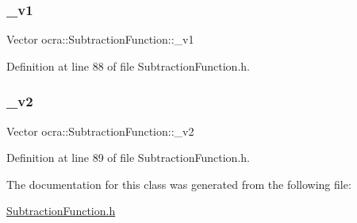 \subsubsection{\texorpdfstring{\+\_\+v1}{\_v1}}
{\footnotesize\ttfamily Vector ocra\+::\+Subtraction\+Function\+::\+\_\+v1\hspace{0.3cm}{\ttfamily [protected]}}



Definition at line 88 of file Subtraction\+Function.\+h.

\hypertarget{classocra_1_1SubtractionFunction_a10736fb0de7f83a54a09055251cf4ad5}{}\label{classocra_1_1SubtractionFunction_a10736fb0de7f83a54a09055251cf4ad5} 
\subsubsection{\texorpdfstring{\+\_\+v2}{\_v2}}
{\footnotesize\ttfamily Vector ocra\+::\+Subtraction\+Function\+::\+\_\+v2\hspace{0.3cm}{\ttfamily [protected]}}



Definition at line 89 of file Subtraction\+Function.\+h.



The documentation for this class was generated from the following file\+:\begin{DoxyCompactItemize}
\item 
\hyperlink{SubtractionFunction_8h}{Subtraction\+Function.\+h}\end{DoxyCompactItemize}
